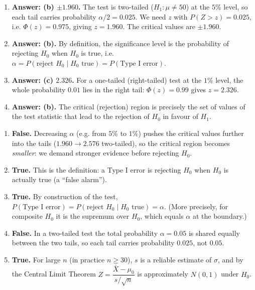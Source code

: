 \documentclass[11pt]{article}
\begin{document}
\begin{corrige}
\begin{enumerate}
\item \textbf{Answer: (b) $\pm 1.960$.} The test is two-tailed ($H_1:\mu\neq 50$) at the $5\%$ level, so each tail carries probability $\alpha/2=0.025$. We need $z$ with $P(Z>z)=0.025$, i.e. $\Phi(z)=0.975$, giving $z=1.960$. The critical values are $\pm 1.960$.
\item \textbf{Answer: (b).} By definition, the significance level is the probability of rejecting $H_0$ when $H_0$ is true, i.e. $\alpha=P(\text{reject }H_0\mid H_0\text{ true})=P(\text{Type I error})$.
\item \textbf{Answer: (c) $2.326$.} For a one-tailed (right-tailed) test at the $1\%$ level, the whole probability $0.01$ lies in the right tail: $\Phi(z)=0.99$ gives $z=2.326$.
\item \textbf{Answer: (b).} The critical (rejection) region is precisely the set of values of the test statistic that lead to the rejection of $H_0$ in favour of $H_1$.
\end{enumerate}
\end{corrige}

\begin{corrige}
\begin{enumerate}
\item \textbf{False.} Decreasing $\alpha$ (e.g. from $5\%$ to $1\%$) pushes the critical values further into the tails ($1.960\to 2.576$ two-tailed), so the critical region becomes \emph{smaller}: we demand stronger evidence before rejecting $H_0$.
\item \textbf{True.} This is the definition: a Type I error is rejecting $H_0$ when $H_0$ is actually true (a ``false alarm'').
\item \textbf{True.} By construction of the test, $P(\text{Type I error})=P(\text{reject }H_0\mid H_0\text{ true})=\alpha$. (More precisely, for composite $H_0$ it is the supremum over $H_0$, which equals $\alpha$ at the boundary.)
\item \textbf{False.} In a two-tailed test the total probability $\alpha=0.05$ is shared equally between the two tails, so each tail carries probability $0.025$, not $0.05$.
\item \textbf{True.} For large $n$ (in practice $n\geq 30$), $s$ is a reliable estimate of $\sigma$, and by the Central Limit Theorem $Z=\dfrac{\bar{X}-\mu_0}{s/\sqrt{n}}$ is approximately $N(0,1)$ under $H_0$.
\end{enumerate}
\end{corrige}
\end{document}

